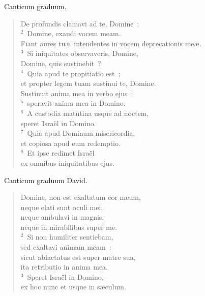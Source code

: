 ~\lettrine[lines=10,image=true,loversize=0.05,lraise=-0.03]{C}{}anticum graduum. \begin{flushleft}\begin{verse}\vspace{6pt}De profundis clamavi ad te, Domine~;\\
${}^{2}$~Domine, exaudi vocem meam.\\ Fiant aures tu\ae\ intendentes in vocem deprecationis me\ae .\\
${}^{3}$~Si iniquitates observaveris, Domine,\\ Domine, quis sustinebit~?\\
${}^{4}$~Quia apud te propitiatio est~;\\ et propter legem tuam sustinui te, Domine.\\ Sustinuit anima mea in verbo ejus~:\\
${}^{5}$~speravit anima mea in Domino.\\
${}^{6}$~A custodia matutina usque ad noctem,\\ speret Isra\"el in Domino.\\
${}^{7}$~Quia apud Dominum misericordia,\\ et copiosa apud eum redemptio.\\
${}^{8}$~Et ipse redimet Isra\"el\\ ex omnibus iniquitatibus ejus.\end{verse}\end{flushleft}


~\lettrine[lines=10,image=true,loversize=0.05,lraise=-0.03]{C}{}anticum graduum David. \begin{flushleft}\begin{verse}\vspace{6pt}Domine, non est exaltatum cor meum,\\ neque elati sunt oculi mei,\\ neque ambulavi in magnis,\\ neque in mirabilibus super me.\\
${}^{2}$~Si non humiliter sentiebam,\\ sed exaltavi animam meam~:\\ sicut ablactatus est super matre sua,\\ ita retributio in anima mea.\\
${}^{3}$~Speret Isra\"el in Domino,\\ ex hoc nunc et usque in s\ae culum.\end{verse}\end{flushleft}


